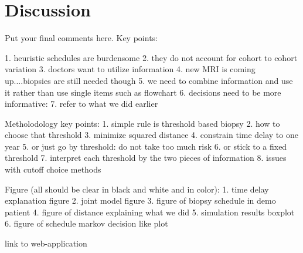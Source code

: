 \section{Discussion}
\label{sec:discussion}

Put your final comments here. 
Key points:

1. heuristic schedules are burdensome
2. they do not account for cohort to cohort variation
3. doctors want to utilize information
4. new MRI is coming up....biopsies are still needed though
5. we need to combine information and use it rather than use single items such as flowchart
6. decisions need to be more informative: 
7. refer to what we did earlier

Metholodology key points:
1. simple rule is threshold based biopsy
2. how to choose that threshold
3. minimize squared distance
4. constrain time delay to one year
5. or just go by threshold: do not take too much risk
6. or stick to a fixed threshold
7. interpret each threshold by the two pieces of information
8. issues with cutoff choice methods

Figure (all should be clear in black and white and in color):
1. time delay explanation figure
2. joint model figure
3. figure of biopsy schedule in demo patient
4. figure of distance explaining what we did
5. simulation results boxplot
6. figure of schedule markov decision like plot


link to web-application